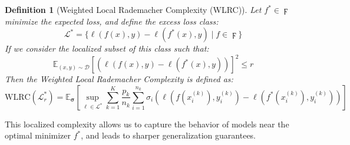 \documentclass{article}
\newtheorem{definition}{Definition}
\begin{document}
\begin{definition}[Weighted Local Rademacher Complexity (WLRC)]
Let \( f^* \in \digamma \) minimize the expected loss, and define the excess loss class:
\[
\mathcal{L}^* = \{ \ell(f(x), y) - \ell(f^*(x), y) \mid f \in \digamma \}
\]
If we consider the localized subset of this class such that:
\[
\mathbb{E}_{(x, y) \sim \mathcal{D}}[(\ell(f(x), y) - \ell(f^*(x), y))]^2 \leq r
\]
Then the Weighted Local Rademacher Complexity is defined as:
\[
\text{WLRC}(\mathcal{L}_r^*) = \mathbb{E}_{\boldsymbol{\sigma}} \left[ \sup_{\ell \in \mathcal{L}^*} \sum_{k=1}^{K} \frac{p_k}{n_k} \sum_{i=1}^{n_k} \sigma_i \left( \ell(f(x_i^{(k)}), y_i^{(k)}) - \ell(f^*(x_i^{(k)}), y_i^{(k)}) \right) \right]
\]
\end{definition}

This localized complexity allows us to capture the behavior of models near the optimal minimizer $f^*$, and leads to sharper generalization guarantees.
\end{document}
